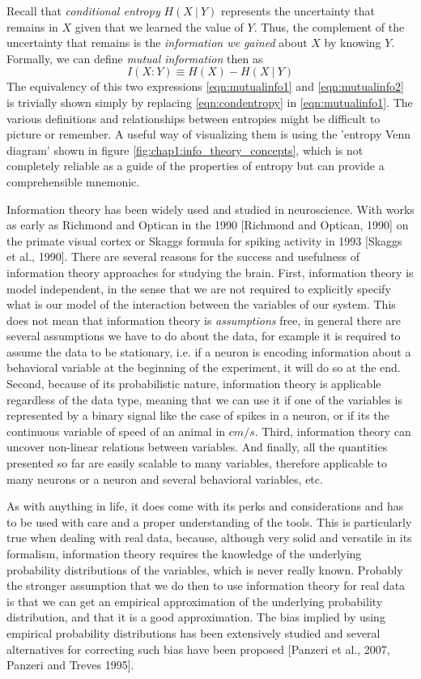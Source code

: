 Recall that \textit{conditional entropy} $H(X\ |\ Y)$ represents the uncertainty that remains in $X$ given that we learned the value of $Y$.
Thus, the complement of the uncertainty that remains is the \textit{information we gained} about $X$ by knowing $Y$. Formally, we can define \textit{mutual information} then as 
\begin{equation}
\label{eqn:mutualinfo2}
    I(X:Y)\equiv H(X) - H(X\ |\ Y)
\end{equation}
The equivalency of this two expressions \ref{eqn:mutualinfo1} and \ref{eqn:mutualinfo2}
is trivially shown simply by replacing \ref{eqn:condentropy} in \ref{eqn:mutualinfo1}.
The various definitions and relationships between entropies might be difficult to picture or remember. 
A useful way of visualizing them is using the 'entropy Venn diagram' shown in figure \ref{fig:chap1:info_theory_concepts}, which is not completely reliable as a guide of the properties of entropy but can provide a comprehensible mnemonic. 

Information theory has been widely used and studied in neuroscience.
With works as early as Richmond and Optican in the 1990 [Richmond and Optican, 1990] on the primate visual cortex or Skaggs formula for spiking activity in 1993 [Skaggs et al., 1990].
There are several reasons for the success and usefulness of information theory approaches for studying the brain.
First, information theory is model independent, in the sense that we are not required to explicitly specify what is our model of the interaction between the variables of our system.
This does not mean that information theory is \textit{assumptions} free, in general there are several assumptions we have to do about the data, for example it is required to assume the data to be stationary, i.e. if a neuron is encoding information about a behavioral variable at the beginning of the experiment, it will do so at the end.     
Second, because of its probabilistic nature, information theory is applicable regardless of the data type, meaning that we can use it if one of the variables is represented by a binary signal like the case of spikes in a neuron, or if its the continuous variable of speed of an animal in $cm/s$.
Third, information theory can uncover non-linear relations between variables.
And finally, all the quantities presented so far are easily scalable to many variables, therefore applicable to many neurons or a neuron and several behavioral variables, etc.

As with anything in life, it does come with its perks and considerations and has to be used with care and a proper understanding of the tools.
This is particularly true when dealing with real data, because, although very solid and versatile in its formalism, information theory requires the knowledge of the underlying probability distributions of the variables, which is never really known. 
Probably the stronger assumption that we do then to use information theory for real data is that we can get an empirical approximation of the underlying probability distribution, and that it is a good approximation. 
The bias implied by using empirical probability distributions has been extensively studied and several alternatives for correcting such bias have been proposed [Panzeri et al., 2007, Panzeri and Treves 1995].

